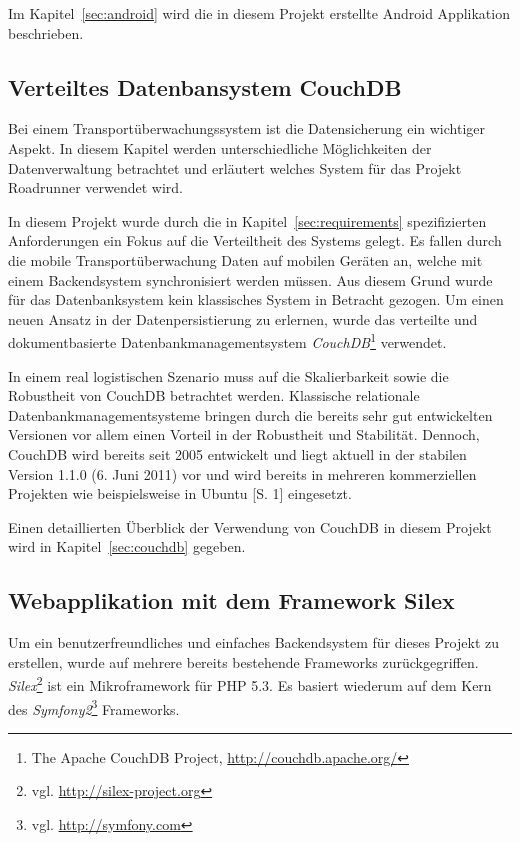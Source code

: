 Im Kapitel~\ref{sec:android} wird die in diesem Projekt erstellte Android Applikation
	beschrieben.

\subsection{Verteiltes Datenbansystem CouchDB}
\label{subsec:couchdb}

Bei einem Transportüberwachungssystem ist die Datensicherung ein
	wichtiger Aspekt. In diesem Kapitel werden unterschiedliche 
	Möglichkeiten der Datenverwaltung betrachtet und erläutert welches
	System für das Projekt Roadrunner verwendet wird.

In diesem Projekt wurde durch die in Kapitel~\ref{sec:requirements} spezifizierten
	Anforderungen ein Fokus auf die Verteiltheit des Systems gelegt. Es fallen
	durch die mobile Transportüberwachung Daten auf mobilen Geräten an, welche
	mit einem Backendsystem synchronisiert werden müssen. Aus diesem Grund wurde
	für das Datenbanksystem kein klassisches System in Betracht gezogen. Um einen
	neuen Ansatz in der Datenpersistierung zu erlernen, wurde das verteilte
	und dokumentbasierte Datenbankmanagementsystem \emph{CouchDB}\footnote{The
	Apache CouchDB Project, \url{http://couchdb.apache.org/}} verwendet.

In einem real logistischen Szenario muss auf die Skalierbarkeit sowie die
	Robustheit von CouchDB betrachtet werden. Klassische relationale
	Datenbankmanagementsysteme bringen durch die bereits sehr gut entwickelten
	Versionen vor allem einen Vorteil in der Robustheit und Stabilität. Dennoch,
	CouchDB wird bereits seit 2005 entwickelt und liegt aktuell in der stabilen
	Version 1.1.0 (6. Juni 2011) vor und wird bereits in mehreren kommerziellen
	Projekten wie beispielsweise in Ubuntu \cite{Murphy09}[S. 1] eingesetzt.

Einen detaillierten Überblick der Verwendung von CouchDB in diesem Projekt
	wird in Kapitel~\ref{sec:couchdb} gegeben.

\subsection{Webapplikation mit dem Framework Silex}
\label{subsec:webapplication}

Um ein benutzerfreundliches und einfaches Backendsystem
	für dieses Projekt zu erstellen, wurde auf mehrere bereits bestehende Frameworks
	zurückgegriffen. \emph{Silex}\footnote{vgl. \url{http://silex-project.org}} ist
	ein	Mikroframework für PHP 5.3. Es basiert wiederum auf dem Kern des
	\emph{Symfony2}\footnote{vgl. \url{http://symfony.com}} Frameworks.
	
